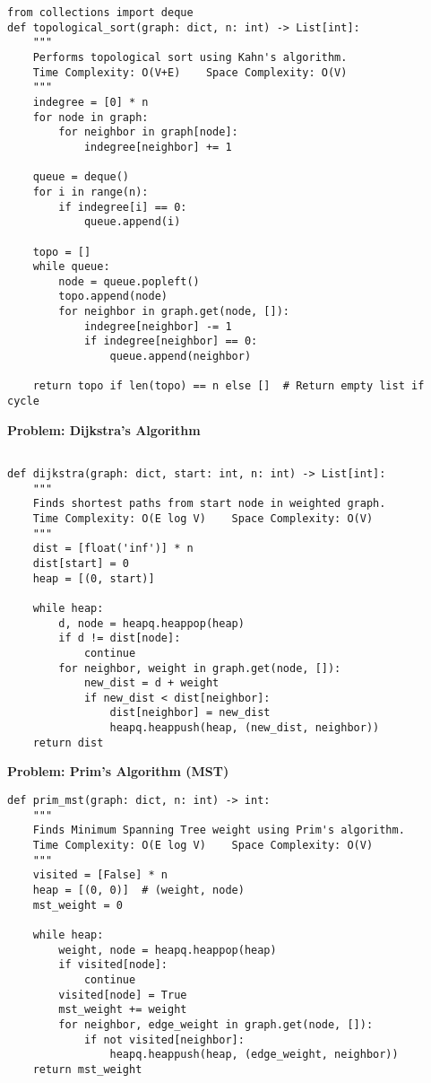 \begin{verbatim}
from collections import deque
def topological_sort(graph: dict, n: int) -> List[int]:
    """
    Performs topological sort using Kahn's algorithm.
    Time Complexity: O(V+E)    Space Complexity: O(V)
    """
    indegree = [0] * n
    for node in graph:
        for neighbor in graph[node]:
            indegree[neighbor] += 1
    
    queue = deque()
    for i in range(n):
        if indegree[i] == 0:
            queue.append(i)
    
    topo = []
    while queue:
        node = queue.popleft()
        topo.append(node)
        for neighbor in graph.get(node, []):
            indegree[neighbor] -= 1
            if indegree[neighbor] == 0:
                queue.append(neighbor)
    
    return topo if len(topo) == n else []  # Return empty list if cycle
\end{verbatim}

\noindent\textbf{Problem: Dijkstra's Algorithm}
\begin{verbatim}

def dijkstra(graph: dict, start: int, n: int) -> List[int]:
    """
    Finds shortest paths from start node in weighted graph.
    Time Complexity: O(E log V)    Space Complexity: O(V)
    """
    dist = [float('inf')] * n
    dist[start] = 0
    heap = [(0, start)]
    
    while heap:
        d, node = heapq.heappop(heap)
        if d != dist[node]:
            continue
        for neighbor, weight in graph.get(node, []):
            new_dist = d + weight
            if new_dist < dist[neighbor]:
                dist[neighbor] = new_dist
                heapq.heappush(heap, (new_dist, neighbor))
    return dist
\end{verbatim}

\noindent\textbf{Problem: Prim's Algorithm (MST)}
\begin{verbatim}
def prim_mst(graph: dict, n: int) -> int:
    """
    Finds Minimum Spanning Tree weight using Prim's algorithm.
    Time Complexity: O(E log V)    Space Complexity: O(V)
    """
    visited = [False] * n
    heap = [(0, 0)]  # (weight, node)
    mst_weight = 0
    
    while heap:
        weight, node = heapq.heappop(heap)
        if visited[node]:
            continue
        visited[node] = True
        mst_weight += weight
        for neighbor, edge_weight in graph.get(node, []):
            if not visited[neighbor]:
                heapq.heappush(heap, (edge_weight, neighbor))
    return mst_weight
\end{verbatim}

